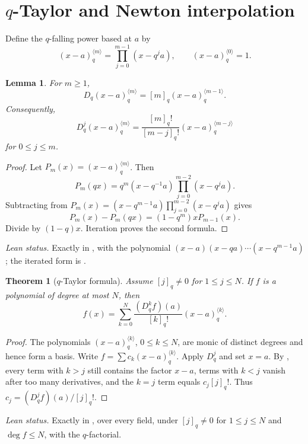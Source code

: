 \documentclass[11pt,a4paper,oneside,openany]{book}
\newtheorem{theorem}{Theorem}[chapter]
\newtheorem{lemma}[lemma]{Lemma}
\theoremstyle{definition}
\theoremstyle{remark}
\newcommand{\QFallingPower}[4]{\left(#1-#2\right)_{#3}^{\langle #4\rangle}}
\begin{document}
\section{\texorpdfstring{$q$}{q}-Taylor and Newton interpolation}

Define the $q$-falling power based at $a$ by
\[
 \QFallingPower{x}{a}{q}{m}=\prod_{j=0}^{m-1}(x-q^ja),
 \qquad \QFallingPower{x}{a}{q}{0}=1.
\]

\begin{lemma}\label{lem:qfalling-derivative}
For $m\ge1$,
\[
 D_q\QFallingPower{x}{a}{q}{m}
 =[m]_q\QFallingPower{x}{a}{q}{m-1}.
\]
Consequently,
\[
 D_q^j\QFallingPower{x}{a}{q}{m}
 =\frac{[m]_q!}{[m-j]_q!}\QFallingPower{x}{a}{q}{m-j}
\]
for $0\le j\le m$.
\end{lemma}

\begin{proof}
Let $P_m(x)=\QFallingPower{x}{a}{q}{m}$.  Then
\[
 P_m(qx)=q^m(x-q^{-1}a)\prod_{j=0}^{m-2}(x-q^ja).
\]
Subtracting from
\(
 P_m(x)=(x-q^{m-1}a)\prod_{j=0}^{m-2}(x-q^ja)
\)
gives
\[
 P_m(x)-P_m(qx)=(1-q^m)xP_{m-1}(x).
\]
Divide by $(1-q)x$.  Iteration proves the second formula.
\end{proof}

\emph{Lean status.}  Exactly  in
, with  the polynomial
$(x-a)(x-qa)\cdots(x-q^{m-1}a)$; the iterated form is
.


\begin{theorem}[$q$-Taylor formula]\label{thm:q-taylor}
Assume $[j]_q\ne0$ for $1\le j\le N$.  If $f$ is a polynomial of degree at most $N$, then
\[
 f(x)=\sum_{k=0}^{N}\frac{(D_q^kf)(a)}{[k]_q!}
 \QFallingPower{x}{a}{q}{k}.
\]
\end{theorem}

\begin{proof}
The polynomials $\QFallingPower{x}{a}{q}{k}$, $0\le k\le N$, are monic of distinct degrees and hence form a basis.  Write
\(
 f=\sum c_k\QFallingPower{x}{a}{q}{k}.
\)
Apply $D_q^j$ and set $x=a$.  By , every term with $k>j$ still contains the factor $x-a$, terms with $k<j$ vanish after too many derivatives, and the $k=j$ term equals $c_j[j]_q!$.  Thus $c_j=(D_q^jf)(a)/[j]_q!$.
\end{proof}

\emph{Lean status.}  Exactly  in , over
every field, under $[j]_q\ne0$ for $1\le j\le N$ and $\deg f\le N$, with
 the $q$-factorial.
\end{document}
